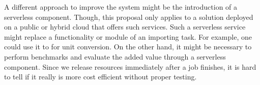 A different approach to improve the system might be the introduction of
a serverless component. Though, this proposal only applies to a solution
deployed on a public or hybrid cloud that offers such services. Such a
serverless service might replace a functionality or module of an
importing task. For example, one could use it to for unit conversion. On
the other hand, it might be necessary to perform benchmarks and evaluate
the added value through a serverless component. Since we release
resources immediately after a job finishes, it is hard to tell if it
really is more cost efficient without proper testing.
